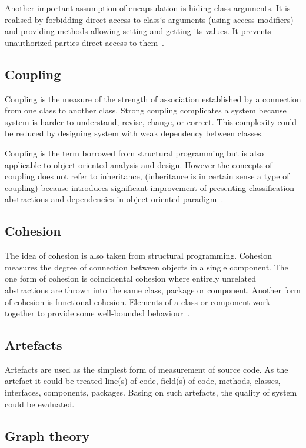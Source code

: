 Another important assumption of encapsulation is hiding class arguments. It is realised by forbidding direct access to class`s arguments (using access modifiers) and providing methods allowing setting and getting its values. It prevents unauthorized parties direct access to them~\cite{SCJP}.

\subsection*{Coupling}
Coupling is the measure of the strength of association established by a connection from one class to another class. Strong coupling complicates a system because system is harder to understand, revise, change, or correct. This complexity could be reduced by designing system with weak dependency between classes.   

Coupling is the term borrowed from structural programming but is also applicable to object-oriented analysis and design. However the concepts of coupling does not refer to inheritance, (inheritance is in certain sense a type of coupling) because introduces significant improvement of presenting classification abstractions and dependencies in object oriented paradigm~\cite{booch}.

\subsection*{Cohesion}
The idea of cohesion is also taken from structural programming. Cohesion measures the degree of connection between objects in a single component. The one form of cohesion is coincidental cohesion where entirely unrelated abstractions are thrown into the same class, package or component. Another form of cohesion is functional cohesion. Elements of a class or component work together to provide some well-bounded behaviour~\cite{booch}.

\subsection*{Artefacts} 
Artefacts are used as the simplest form of measurement of source code. As the artefact it could be treated line(s) of code, field(s) of code, methods, classes, interfaces, components, packages. Basing on such artefacts, the quality of system could be evaluated. 

\subsection*{Graph theory}\label{section:graph_theory}

